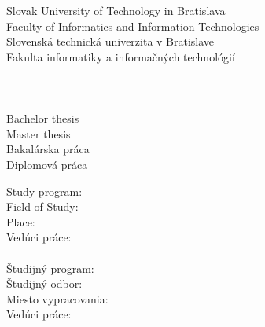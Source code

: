 \begin{center}
\thispagestyle{empty}
{
	{\Large Slovak University of Technology in Bratislava}\textbf{}\\
	{\Large Faculty of Informatics and Information Technologies}\textbf{}\\[\baselineskip]
}
{
	{\Large Slovenská technická univerzita v Bratislave}\textbf{}\\
	{\Large Fakulta informatiky a informačných technológií}\textbf{}\\[\baselineskip]
}
{\large \FIIT}\\
\vspace*{5cm}
{\Large \Author}\textbf{}\\[\baselineskip]
{\huge \Title}\textbf{}\\[\baselineskip]
{
	{
		{\large Bachelor thesis}\\
	}
	{
		{\large Master thesis}\\
	}
}
{
	{
		{\large Bakalárska práca}\\
	}
	{
		{\large Diplomová práca}\\
	}
}
\end{center}
\vspace*{3.6cm}
{
	Study program: \Program\\
	Field of Study: \Field\\
	Place: \Place\\
	Vedúci práce: \Supervisor \\\\
}
{
	Študijný program: \Program\\
	Študijný odbor: \Field\\
	Miesto vypracovania: \Place\\
	Vedúci práce: \Supervisor \\\\
}
\Month \Year
